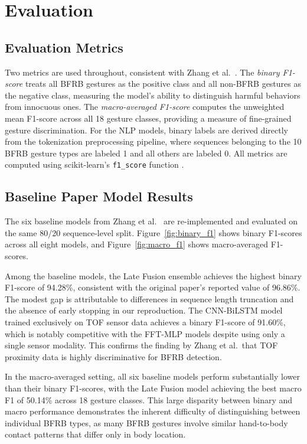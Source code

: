 \documentclass[conference]{IEEEtran}
\begin{document}
\clearpage
\section{Evaluation}
\label{sec:evaluation}
 
\subsection{Evaluation Metrics}
 
Two metrics are used throughout, consistent with Zhang et al.\ \cite{zhang2025detection}. The \textit{binary F1-score} treats all BFRB gestures as the positive class and all non-BFRB gestures as the negative class, measuring the model's ability to distinguish harmful behaviors from innocuous ones. The \textit{macro-averaged F1-score} computes the unweighted mean F1-score across all 18 gesture classes, providing a measure of fine-grained gesture discrimination. For the NLP models, binary labels are derived directly from the tokenization preprocessing pipeline, where sequences belonging to the 10 BFRB gesture types are labeled 1 and all others are labeled 0. All metrics are computed using scikit-learn's \texttt{f1\_score} function \cite{scikit2025api}.
 
\subsection{Baseline Paper Model Results}
 
The six baseline models from Zhang et al.\ \cite{zhang2025detection} are re-implemented and evaluated on the same 80/20 sequence-level split. Figure~\ref{fig:binary_f1} shows binary F1-scores across all eight models, and Figure~\ref{fig:macro_f1} shows macro-averaged F1-scores.
 
Among the baseline models, the Late Fusion ensemble achieves the highest binary F1-score of 94.28\%, consistent with the original paper's reported value of 96.86\%. The modest gap is attributable to differences in sequence length truncation and the absence of early stopping in our reproduction. The CNN-BiLSTM model trained exclusively on TOF sensor data achieves a binary F1-score of 91.60\%, which is notably competitive with the FFT-MLP models despite using only a single sensor modality. This confirms the finding by Zhang et al.\ that TOF proximity data is highly discriminative for BFRB detection.
 
In the macro-averaged setting, all six baseline models perform substantially lower than their binary F1-scores, with the Late Fusion model achieving the best macro F1 of 50.14\% across 18 gesture classes. This large disparity between binary and macro performance demonstrates the inherent difficulty of distinguishing between individual BFRB types, as many BFRB gestures involve similar hand-to-body contact patterns that differ only in body location.
\end{document}
